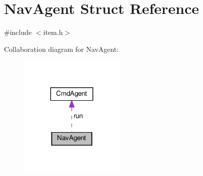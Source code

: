 \hypertarget{structNavAgent}{}\section{Nav\+Agent Struct Reference}
\label{structNavAgent}


{\ttfamily \#include $<$item.\+h$>$}



Collaboration diagram for Nav\+Agent\+:\nopagebreak
\begin{figure}[H]
\begin{center}
\leavevmode
\includegraphics[width=143pt]{structNavAgent__coll__graph}
\end{center}
\end{figure}
